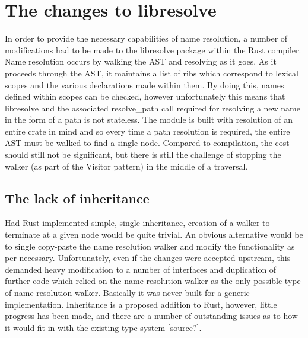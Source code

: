 \section{The changes to libresolve}\label{S:changes}
In order to provide the necessary capabilities of name resolution, a number of modifications had to be made to the libresolve package within the Rust compiler. Name resolution occurs by walking the AST and resolving as it goes. As it proceeds through the AST, it maintains a list of ribs which correspond to lexical scopes and the various declarations made within them. By doing this, names defined within scopes can be checked, however unfortunately this means that libresolve and the associated resolve\_path call required for resolving a new name in the form of a path is not stateless. The module is built with resolution of an entire crate in mind and so every time a path resolution is required, the entire AST must be walked to find a single node. Compared to compilation, the cost should still not be significant, but there is still the challenge of stopping the walker (as part of the Visitor pattern) in the middle of a traversal. 

\subsection{The lack of inheritance}
Had Rust implemented simple, single inheritance, creation of a walker to terminate at a given node would be quite trivial. An obvious alternative would be to single copy-paste the name resolution walker and modify the functionality as per necessary. Unfortunately, even if the changes were accepted upstream, this demanded heavy modification to a number of interfaces and duplication of further code which relied on the name resolution walker as the only possible type of name resolution walker. Basically it was never built for a generic implementation. Inheritance is a proposed addition to Rust, however, little progress has been made, and there are a number of outstanding issues as to how it would fit in with the existing type system [source?].



